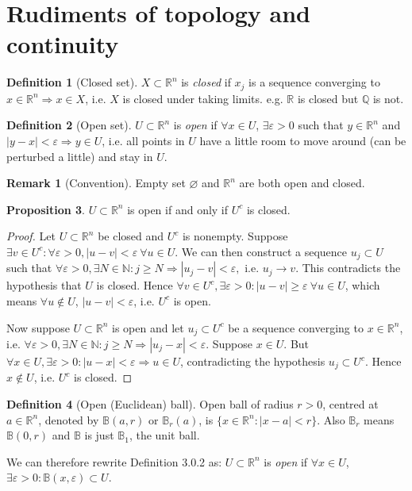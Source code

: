 \documentclass[a4paper]{article}
\theoremstyle{definition}
\newtheorem{defn}{Definition}[subsection]
\newtheorem{prop}[defn]{Proposition}
\newtheorem*{remark}{Remark}
\begin{document}
\section{Rudiments of topology and continuity}
\begin{defn}[Closed set]
	$X \subset \mathbb R^n$ is \textit{closed} if $x_j$ is a sequence converging to $x \in \mathbb R^n \Rightarrow x \in X$, i.e. $X$ is closed under taking limits. e.g. $\mathbb R$ is closed but $\mathbb Q$ is not.
\end{defn}
\begin{defn}[Open set]
	$U \subset \mathbb R^n$ is \textit{open} if $\forall x \in U$, $\exists \varepsilon >0$ such that $y\in \mathbb R^n$ and $|y-x|<\varepsilon \Rightarrow y\in U$, i.e. all points in $U$ have a little room to move around (can be perturbed a little) and stay in $U$.
\end{defn}

\begin{remark}[Convention]
Empty set $\varnothing$ and $\mathbb R^n$ are both open and closed.
\end{remark}

\begin{prop}
$U\subset \mathbb R^n$ is open if and only if $U^c$ is closed.
\end{prop}
\begin{proof}
Let $U \subset \mathbb R^n$ be closed and $U^c$ is nonempty. Suppose $\exists v\in U^c : \forall \varepsilon >0, |u-v|< \varepsilon \ \forall u\in U$. We can then construct a sequence $u_j\subset U$ such that $\forall \varepsilon >0, \exists N\in \mathbb N: j\geq N \Rightarrow |u_j-v|<\varepsilon ,$ i.e. $u_j\rightarrow v$. This contradicts the hypothesis that $U$ is closed. Hence $\forall v\in U^c, \exists \varepsilon >0 : |u-v|\geq \varepsilon \ \forall u\in U$, which means $\forall u\not\in U$, $|u-v|<\varepsilon$, i.e. $U^c$ is open.

Now suppose $U\subset \mathbb R^n$ is open and let $u_j \subset U^c$ be a sequence converging to $x\in \mathbb R^n$, i.e. $\forall \varepsilon >0, \exists N\in \mathbb N:j\geq N \Rightarrow |u_j-x|<\varepsilon .$ Suppose $x\in U$. But $\forall x\in U, \exists \varepsilon >0: |u-x|<\varepsilon \Rightarrow u\in U$, contradicting the hypothesis $u_j\subset U^c$. Hence $x\not\in U$, i.e. $U^c$ is closed.
\end{proof}

\begin{defn}[Open (Euclidean) ball]
Open ball of radius $r>0$, centred at $a\in \mathbb R^n$, denoted by $\mathbb B(a,r)$ or $\mathbb B_r(a)$, is $\{x\in \mathbb R^n : |x-a|<r\}$. Also $\mathbb B_r$ means $\mathbb B(0,r)$ and $\mathbb B$ is just $\mathbb B_1$, the unit ball.
\end{defn}
We can therefore rewrite Definition 3.0.2 as: $U\subset \mathbb R^n$ is \textit{open} if $\forall x\in U$, $\exists \varepsilon >0: \mathbb B(x,\varepsilon)\subset U$.
\end{document}
